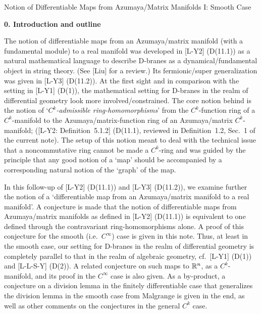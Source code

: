 \documentclass[11pt]{article}
\numberwithin{equation}{subsection}
\begin{document}
\centerline{\sc
 Notion of Differentiable Maps from Azumaya/Matrix Manifolds I: Smooth Case
 } %

\vspace{2em}


\begin{flushleft}
{\Large\bf 0. Introduction and outline}
\end{flushleft}
%
The notion of differentiable maps from an Azumaya/matrix manifold
 (with a fundamental module) to a real manifold
 was developed in [L-Y2] (D(11.1))
 as a natural mathematical language to describe D-branes as a dynamical/fundamental object in string theory.
(See [Liu] for a review.)
Its fermionic/super generalization was given  in [L-Y3] (D(11.2)).
At the first sight and in comparison with the setting in [L-Y1] (D(1)),
 the mathematical setting for D-branes in the realm of differential geometry
  look more involved/constrained.
The core notion behind is the notion of
 `{\it $C^k$-admissible ring-homomorphisms}' from the $C^k$-function ring of a $C^k$-manifold
 to  the Azumaya/matrix-function ring of an Azumaya/matrix $C^k$-manifold;
 ([L-Y2: Definition~5.1.2] (D(11.1), reviewed in Definition~1.2, Sec.\ 1 of the current note).
The setup of this notion meant to deal with the technical issue
     that a noncommutative ring cannot be made a $C^k$-ring
 and was guided by the principle
    that any good notion of a `map' should be accompanied by a corresponding natural notion
     of the `graph' of the map.
	
 In this follow-up of [L-Y2] (D(11.1)) and [L-Y3] (D(11.2)), 	
 we examine further
   the notion of a `differentiable map from an Azumaya/matrix manifold to a real manifold'.
 A conjecture is made
  that  the notion of differentiable maps from Azumaya/matrix manifolds
    as defined in [L-Y2] (D(11.1))
    is equivalent to one defined through the contravariant ring-homomorphisms alone.
 A proof  of this conjecture for the smooth (i.e.\ $C^{\infty}$) case is given in this note.
 Thus, at least in the smooth case,
  our setting for D-branes in the realm of differential geometry
  is completely parallel to that in the realm of algebraic geometry,
  cf.\ [L-Y1] (D(1)) and [L-L-S-Y] (D(2)).
 A related conjecture on such maps to ${\Bbb R}^n$, as a $C^k$-manifold,
  and its proof in the $C^{\infty}$ case is also given.
 As a by-product, a conjecture on a division lemma in the finitely differentiable case
  that generalizes the division lemma in the smooth case from Malgrange
  is given in the end, as well as other comments on the conjectures in the general $C^k$ case.
\end{document}
